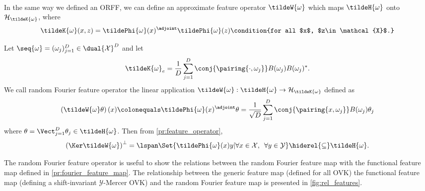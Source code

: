 \paragraph{}
In the same way we defined an \acs{ORFF}, we can define an approximate feature
operator $\tildeW{\omega}$ which maps $\tildeH{\omega}$ onto
$\mathcal{H}_{\tildeK{\omega}}$, where
\begin{dmath*}
    \tildeK{\omega}(x,z)=
    \tildePhi{\omega}(x)^\adjoint\tildePhi{\omega}(z)\condition{for
    all $x$, $z\in\mathcal{X}$.}
\end{dmath*}
\begin{definition}
    Let $\seq{\omega}=(\omega_j)_{j=1}^D\in\dual{\mathcal{X}}^D$ and let
    \begin{dmath*}
        \tildeK{\omega}_e=\frac{1}{D}\sum_{j=1}^D
        \conj{\pairing{\cdot,\omega_j}}B(\omega_j)B(\omega_j)^*.
    \end{dmath*}
    We call random Fourier feature operator the linear application
    $\tildeW{\omega}:\tildeH{\omega}\to \mathcal{H}_{\tildeK{\omega}}$ defined
    as
    \begin{dmath*}
        \left(\tildeW{\omega} \theta\right)(x)
        \colonequals \tildePhi{\omega}(x)^\adjoint \theta
        =\frac{1}{\sqrt{D}}\sum_{j=1}^D
        \conj{\pairing{x,\omega_j}}B(\omega_j)\theta_j
    \end{dmath*}
    where
    $\theta=\Vect_{j=1}^D\theta_j \in\tildeH{\omega}$.
    Then from \cref{pr:feature_operator},
    \begin{dmath*}
        \left(\Ker \tildeW{\omega}\right)^\perp
        = \lspan\Set{\tildePhi{\omega}(x)y | \forall x\in\mathcal{X},\enskip
        \forall y\in\mathcal{Y}} \hiderel{\subseteq} \tildeH{\omega}.
    \end{dmath*}
\end{definition}
The random Fourier feature operator is useful to show the relations between the
random Fourier feature map with the functional feature map defined in
\cref{pr:fourier_feature_map}. The relationship between the generic feature map
(defined for all \acl{OVK}) the functional feature map (defining a
shift-invariant $\mathcal{Y}$-Mercer \acl{OVK}) and the random Fourier feature
map is presented in \cref{fig:rel_features}.
